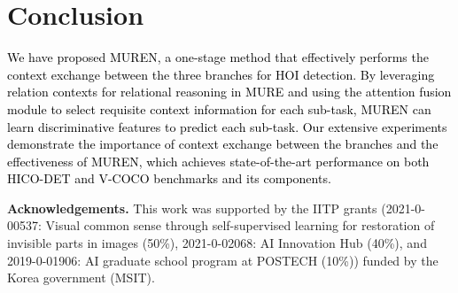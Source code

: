 \documentclass[10pt,twocolumn,letterpaper]{article}
\newcommand{\sh}[1]{\textcolor{black}{#1}}
\begin{document}
 \section{Conclusion}
\sh{We have proposed MUREN, a one-stage method that effectively performs the context exchange between the three branches for HOI detection. 
By leveraging relation contexts for relational reasoning in MURE and using the attention fusion module to select requisite context information for each sub-task, MUREN can learn discriminative features to predict each sub-task.
Our extensive experiments demonstrate the importance of context exchange between the branches and the effectiveness of MUREN, which achieves state-of-the-art performance on both HICO-DET and V-COCO benchmarks and its components.
}


\noindent \textbf{Acknowledgements.}
This work was supported by the IITP grants (2021-0-00537: Visual common sense through self-supervised learning for restoration of invisible parts in images (50\%), 2021-0-02068: AI Innovation Hub (40\%), and 2019-0-01906: AI graduate school program at POSTECH (10\%)) funded by the Korea government (MSIT).




%
 {\small


}
\end{document}

